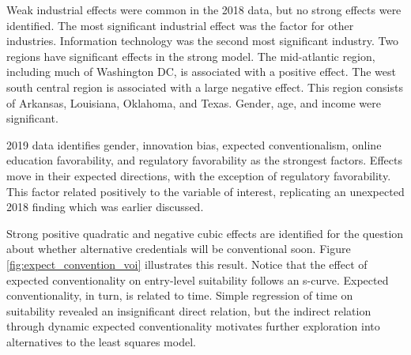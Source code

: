 \documentclass[AER]{./aea-latex-templates/AEA}
\begin{document}
        Weak industrial effects were common in the 2018 data, but no strong effects were identified.
        The most significant industrial effect was the factor for other industries. Information technology was the second most significant industry.
        Two regions have significant effects in the strong model.
        The mid-atlantic region, including much of Washington DC, is associated with a positive effect.
        The west south central region is associated with a large negative effect.
        This region consists of Arkansas, Louisiana, Oklahoma, and Texas\cite{uscensusbureau_2016}.
        Gender, age, and income were significant.
        
        2019 data identifies gender, innovation bias, expected
        conventionalism, online education favorability, and regulatory
        favorability as the strongest factors. Effects move in their expected directions,
        with the exception of regulatory favorability.
        This factor related positively to the variable of interest, replicating an unexpected 2018 finding which was earlier discussed.
        
        Strong positive quadratic and negative cubic effects are identified for
        the question about whether alternative credentials will be conventional soon.
        Figure \ref{fig:expect_convention_voi} illustrates this result. Notice that the effect of expected conventionality on entry-level suitability follows an s-curve.
        Expected conventionality, in turn, is related to time.
        Simple regression of time on suitability revealed an insignificant direct relation,
        but the indirect relation through dynamic expected conventionality motivates further exploration into alternatives to the least squares model.
        
\end{document}
